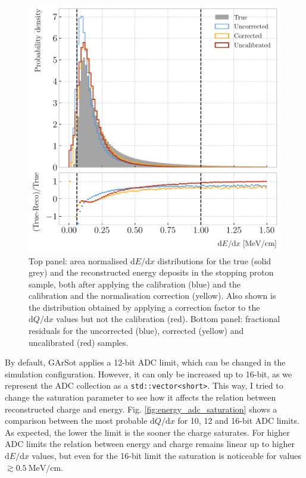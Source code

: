 \begin{figure}[t]
	\centering
	\includegraphics[width=.80\linewidth]{Images/GArSoft_PID/dEdx/reco_dEdx_corrected_1d.pdf}
	\caption[Area normalised $\mathrm{d}E/\mathrm{d}x$ distributions for the true and the reconstructed energy deposits in the stopping proton sample, both after applying the calibration and the calibration and the normalisation correction.]{Top panel: area normalised $\mathrm{d}E/\mathrm{d}x$ distributions for the true (solid grey) and the reconstructed energy deposits in the stopping proton sample, both after applying the calibration (blue) and the calibration and the normalisation correction (yellow). Also shown is the distribution obtained by applying a correction factor to the $\mathrm{d}Q/\mathrm{d}x$ values but not the calibration (red). Bottom panel: fractional residuals for the uncorrected (blue), corrected (yellow) and uncalibrated (red) samples.}
	\label{fig:energy_correction}
\end{figure}

By default, GArSot applies a 12-bit ADC limit, which can be changed in the simulation configuration. However, it can only be increased up to 16-bit, as we represent the ADC collection as a \texttt{std::vector<short>}. This way, I tried to change the saturation parameter to see how it affects the relation between reconstructed charge and energy. Fig. \ref{fig:energy_adc_saturation} shows a comparison between the most probable $\mathrm{d}Q/\mathrm{d}x$ for 10, 12 and 16-bit ADC limits. As expected, the lower the limit is the sooner the charge saturates. For higher ADC limits the relation between energy and charge remains linear up to higher $\mathrm{d}E/\mathrm{d}x$ values, but even for the 16-bit limit the saturation is noticeable for values $\gtrsim 0.5 ~ \mathrm{MeV}/\mathrm{cm}$.

